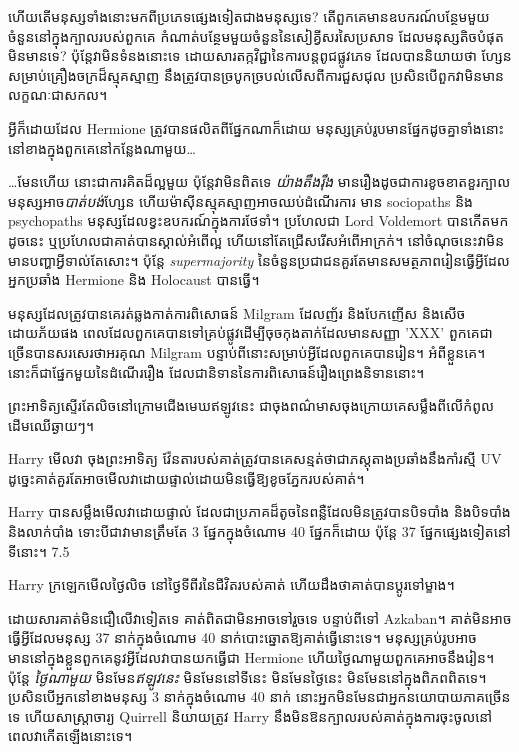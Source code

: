 {{{{{{{ហើយ​តើ​មនុស្ស​ទាំង​នោះ​មក​ពី​ប្រភេទ​ផ្សេង​ទៀត​ជាង​មនុស្ស​ទេ? តើពួកគេមានឧបករណ៍បន្ថែមមួយចំនួននៅក្នុងក្បាលរបស់ពួកគេ កំណាត់បន្ថែមមួយចំនួននៃសៀគ្វីសរសៃប្រសាទ ដែលមនុស្សតិចបំផុតមិនមានទេ? ប៉ុន្តែវាមិនទំនងនោះទេ ដោយសារតក្កវិជ្ជានៃការបន្តពូជផ្លូវភេទ ដែលបាននិយាយថា ហ្សែនសម្រាប់គ្រឿងចក្រដ៏ស្មុគស្មាញ នឹងត្រូវបានច្របូកច្របល់លើសពីការជួសជុល ប្រសិនបើពួកវាមិនមានលក្ខណៈជាសកល។

អ្វីក៏ដោយដែល Hermione ត្រូវបានផលិតពីផ្នែកណាក៏ដោយ មនុស្សគ្រប់រូបមានផ្នែកដូចគ្នាទាំងនោះនៅខាងក្នុងពួកគេនៅកន្លែងណាមួយ…

…មែនហើយ នោះជាការគិតដ៏ល្អមួយ ប៉ុន្តែវាមិនពិតទេ \emph{យ៉ាងតឹងរ៉ឹង} មានរឿងដូចជាការខូចខាតខួរក្បាលមនុស្សអាច\emph{បាត់បង់}ហ្សែន ហើយម៉ាស៊ីនស្មុគស្មាញអាចឈប់ដំណើរការ មាន sociopaths និង psychopaths មនុស្សដែលខ្វះឧបករណ៍ក្នុងការថែទាំ។ ប្រហែលជា Lord Voldemort បានកើតមកដូចនេះ ឬប្រហែលជាគាត់បានស្គាល់អំពើល្អ ហើយនៅតែជ្រើសរើសអំពើអាក្រក់។ នៅចំណុចនេះវាមិនមានបញ្ហាអ្វីទាល់តែសោះ។ ប៉ុន្តែ \emph{supermajority} នៃចំនួនប្រជាជនគួរតែមានសមត្ថភាពរៀនធ្វើអ្វីដែលអ្នកប្រឆាំង Hermione និង Holocaust បានធ្វើ។

មនុស្សដែលត្រូវបានគេរត់ឆ្លងកាត់ការពិសោធន៍ Milgram ដែលញ័រ និងបែកញើស និងសើចដោយភ័យផង ពេលដែលពួកគេបានទៅគ្រប់ផ្លូវដើម្បីចុចកុងតាក់ដែលមានសញ្ញា 'XXX' ពួកគេជាច្រើនបានសរសេរថាអរគុណ Milgram បន្ទាប់ពីនោះសម្រាប់អ្វីដែលពួកគេបានរៀន។ អំពីខ្លួនគេ។ នោះ​ក៏​ជា​ផ្នែក​មួយ​នៃ​ដំណើរ​រឿង ដែល​ជា​និទាន​នៃ​ការ​ពិសោធន៍​រឿងព្រេង​និទាន​នោះ។

ព្រះអាទិត្យស្ទើរតែលិចនៅក្រោមជើងមេឃឥឡូវនេះ ជាចុងពណ៌មាសចុងក្រោយគេសម្លឹងពីលើកំពូលដើមឈើឆ្ងាយៗ។

Harry មើលវា ចុងព្រះអាទិត្យ វ៉ែនតារបស់គាត់ត្រូវបានគេសន្មត់ថាជាភស្តុតាងប្រឆាំងនឹងកាំរស្មី UV ដូច្នេះគាត់គួរតែអាចមើលវាដោយផ្ទាល់ដោយមិនធ្វើឱ្យខូចភ្នែករបស់គាត់។

Harry បានសម្លឹងមើលវាដោយផ្ទាល់ ដែលជាប្រភាគដ៏តូចនៃពន្លឺដែលមិនត្រូវបានបិទបាំង និងបិទបាំង និងលាក់បាំង ទោះបីជាវាមានត្រឹមតែ 3 ផ្នែកក្នុងចំណោម 40 ផ្នែកក៏ដោយ ប៉ុន្តែ 37 ផ្នែកផ្សេងទៀតនៅទីនោះ។ 7.5%

Harry ក្រឡេកមើលថ្ងៃលិច នៅថ្ងៃទីពីរនៃជីវិតរបស់គាត់ ហើយដឹងថាគាត់បានប្តូរទៅម្ខាង។

ដោយ​សារ​គាត់​មិន​ជឿ​លើ​វា​ទៀត​ទេ គាត់​ពិត​ជា​មិន​អាច​ទៅ​រួច​ទេ បន្ទាប់​ពី​ទៅ Azkaban។ គាត់មិនអាចធ្វើអ្វីដែលមនុស្ស 37 នាក់ក្នុងចំណោម 40 នាក់បោះឆ្នោតឱ្យគាត់ធ្វើនោះទេ។ មនុស្សគ្រប់រូបអាចមាននៅក្នុងខ្លួនពួកគេនូវអ្វីដែលវាបានយកធ្វើជា Hermione ហើយថ្ងៃណាមួយពួកគេអាចនឹងរៀន។ ប៉ុន្តែ \emph{ថ្ងៃណាមួយ} មិនមែន\emph{ឥឡូវនេះ} មិនមែននៅទីនេះ មិនមែនថ្ងៃនេះ មិនមែននៅក្នុងពិភពពិតទេ។ ប្រសិនបើអ្នកនៅខាងមនុស្ស 3 នាក់ក្នុងចំណោម 40 នាក់ នោះអ្នកមិនមែនជាអ្នកនយោបាយភាគច្រើនទេ ហើយសាស្រ្តាចារ្យ Quirrell និយាយត្រូវ Harry នឹងមិនឱនក្បាលរបស់គាត់ក្នុងការចុះចូលនៅពេលវាកើតឡើងនោះទេ។

}}}}}}}
